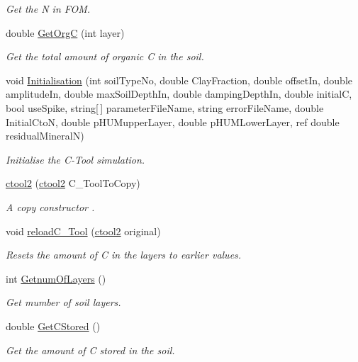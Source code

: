 \begin{DoxyCompactItemize}
\begin{DoxyCompactList}\small\item\em Get the N in F\+OM. \end{DoxyCompactList}\item 
double \mbox{\hyperlink{classctool2_a4fe5c0ef250c6b583869ea8f3a9bfaca}{Get\+OrgC}} (int layer)
\begin{DoxyCompactList}\small\item\em Get the total amount of organic C in the soil. \end{DoxyCompactList}\item 
void \mbox{\hyperlink{classctool2_ad657aea1170e4929c7b96709f319f41c}{Initialisation}} (int soil\+Type\+No, double Clay\+Fraction, double offset\+In, double amplitude\+In, double max\+Soil\+Depth\+In, double damping\+Depth\+In, double initialC, bool use\+Spike, string\mbox{[}$\,$\mbox{]} parameter\+File\+Name, string error\+File\+Name, double Initial\+CtoN, double p\+H\+U\+Mupper\+Layer, double p\+H\+U\+M\+Lower\+Layer, ref double residual\+MineralN)
\begin{DoxyCompactList}\small\item\em Initialise the C-\/\+Tool simulation. \end{DoxyCompactList}\item 
\mbox{\hyperlink{classctool2_aa42611f6b7b54168648f5b7896157e51}{ctool2}} (\mbox{\hyperlink{classctool2}{ctool2}} C\+\_\+\+Tool\+To\+Copy)
\begin{DoxyCompactList}\small\item\em A copy constructor . \end{DoxyCompactList}\item 
void \mbox{\hyperlink{classctool2_a463a13b4941af48d351824a9b4a5e400}{reload\+C\+\_\+\+Tool}} (\mbox{\hyperlink{classctool2}{ctool2}} original)
\begin{DoxyCompactList}\small\item\em Resets the amount of C in the layers to earlier values. \end{DoxyCompactList}\item 
int \mbox{\hyperlink{classctool2_ab86d9eac33a5b0e729a9c08e62ce2cac}{Getnum\+Of\+Layers}} ()
\begin{DoxyCompactList}\small\item\em Get mumber of soil layers. \end{DoxyCompactList}\item 
double \mbox{\hyperlink{classctool2_a4002bf436d8ceb479203d186315a66e9}{Get\+C\+Stored}} ()
\begin{DoxyCompactList}\small\item\em Get the amount of C stored in the soil. \end{DoxyCompactList}\item 

\end{DoxyCompactItemize}
